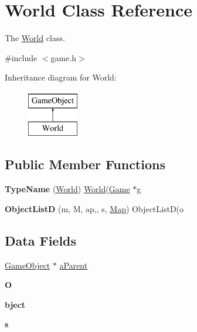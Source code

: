 \hypertarget{class_world}{\section{\-World \-Class \-Reference}
\label{class_world}
}


\-The \hyperlink{class_world}{\-World} class.  




{\ttfamily \#include $<$game.\-h$>$}

\-Inheritance diagram for \-World\-:\begin{figure}[H]
\begin{center}
\leavevmode
\includegraphics[height=2.000000cm]{class_world}
\end{center}
\end{figure}
\subsection*{\-Public \-Member \-Functions}
\begin{DoxyCompactItemize}
\item 
\hypertarget{class_world_a9b9332f44adcdf278a8f47aac205ac53}{{\bfseries \-Type\-Name} (\hyperlink{class_world}{\-World}) \hyperlink{class_world}{\-World}(\hyperlink{class_game}{\-Game} $\ast$g}\label{class_world_a9b9332f44adcdf278a8f47aac205ac53}

\item 
\hypertarget{class_world_a7fe6abb143814e0f87145648982f46af}{{\bfseries \-Object\-List\-D} (m, \-M, ap,, s, \hyperlink{class_map}{\-Map}) \-Object\-List\-D(o}\label{class_world_a7fe6abb143814e0f87145648982f46af}

\end{DoxyCompactItemize}
\subsection*{\-Data \-Fields}
\begin{DoxyCompactItemize}
\item 
\hyperlink{class_game_object}{\-Game\-Object} $\ast$ \hyperlink{class_world_af24924a1b6c6596b1c0a293651ffccaf}{a\-Parent}
\item 
\hypertarget{class_world_a180c9e33dc6e59ca8e097bc9e6a36503}{{\bfseries \-O}}\label{class_world_a180c9e33dc6e59ca8e097bc9e6a36503}

\item 
\hypertarget{class_world_a2c3ed57fb27e57a197a2218f196950e2}{{\bfseries bject}}\label{class_world_a2c3ed57fb27e57a197a2218f196950e2}

\item 
\hypertarget{class_world_a985aab8b792338c2a1718f4ec46f88dc}{{\bfseries s}}\label{class_world_a985aab8b792338c2a1718f4ec46f88dc}

\end{DoxyCompactItemize}



